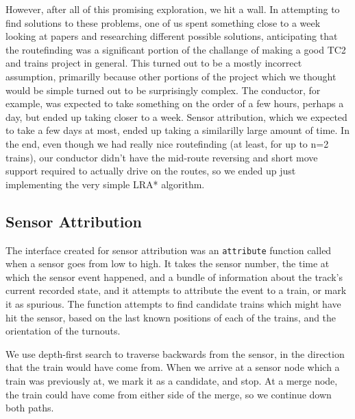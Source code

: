 \documentclass{article}
\begin{document}
However, after all of this promising exploration, we hit a wall. In attempting
to find solutions to these problems, one of us spent something
close to a week looking at papers and researching different possible solutions,
anticipating that the routefinding was a significant portion of the challange
of making a good TC2 and trains project in general. This turned out to be a
mostly incorrect assumption, primarilly because other portions of the project
which we thought would be simple turned out to be surprisingly complex. The
conductor, for example, was expected to take something on the order of a few
hours, perhaps a day, but ended up taking closer to a week. Sensor attribution,
which we expected to take a few days at most, ended up taking a similarilly
large amount of time. In the end, even though we had really nice routefinding
(at least, for up to n=2 trains), our conductor didn't have the mid-route
reversing and short move support required to actually drive on the routes, so
we ended up just implementing the very simple LRA* algorithm.

\subsection{Sensor Attribution}
The interface created for sensor attribution was an \texttt{attribute} function called when a sensor goes from low to high.
It takes the sensor number, the time at which the sensor event happened, and a bundle of information about the track's current
recorded state, and it attempts to attribute the event to a train, or mark it as spurious.
The function attempts to find candidate trains which might have hit the sensor, based on the last
known positions of each of the trains, and the orientation of the turnouts.

We use depth-first search to traverse backwards from the sensor, in the direction that the train would have come from.
When we arrive at a sensor node which a train was previously at, we mark it as a candidate, and stop.
At a merge node, the train could have come from either side of the merge, so we continue down both
paths.
\end{document}
